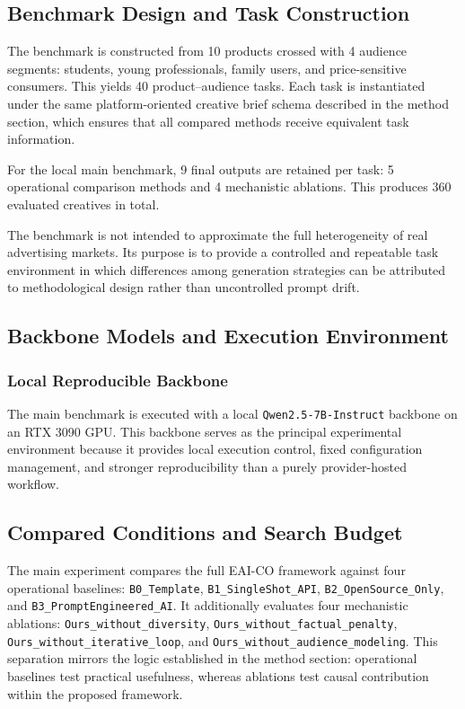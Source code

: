 \documentclass[applsci,article,submit,pdftex,moreauthors]{Definitions/mdpi}
\begin{document}
\subsection{Benchmark Design and Task Construction}

The benchmark is constructed from 10 products crossed with 4 audience segments: students, young professionals, family users, and price-sensitive consumers. This yields 40 product--audience tasks. Each task is instantiated under the same platform-oriented creative brief schema described in the method section, which ensures that all compared methods receive equivalent task information.

For the local main benchmark, 9 final outputs are retained per task: 5 operational comparison methods and 4 mechanistic ablations. This produces 360 evaluated creatives in total.

The benchmark is not intended to approximate the full heterogeneity of real advertising markets. Its purpose is to provide a controlled and repeatable task environment in which differences among generation strategies can be attributed to methodological design rather than uncontrolled prompt drift.

\subsection{Backbone Models and Execution Environment}

\subsubsection{Local Reproducible Backbone}

The main benchmark is executed with a local \texttt{Qwen2.5-7B-Instruct} backbone on an RTX 3090 GPU. This backbone serves as the principal experimental environment because it provides local execution control, fixed configuration management, and stronger reproducibility than a purely provider-hosted workflow.

\subsection{Compared Conditions and Search Budget}

The main experiment compares the full EAI-CO framework against four operational baselines: \texttt{B0\_Template}, \texttt{B1\_SingleShot\_API}, \texttt{B2\_OpenSource\_Only}, and \texttt{B3\_PromptEngineered\_AI}. It additionally evaluates four mechanistic ablations: \texttt{Ours\_without\_diversity}, \texttt{Ours\_without\_factual\_penalty}, \texttt{Ours\_without\_iterative\_loop}, and \texttt{Ours\_without\_audience\_modeling}. This separation mirrors the logic established in the method section: operational baselines test practical usefulness, whereas ablations test causal contribution within the proposed framework.
\end{document}
